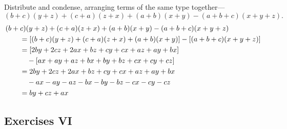 \documentclass[DIN, pagenumber=false, fontsize=11pt, parskip=half]{scrartcl}
\begin{document}
\begin{problems}[from=1,step=1]
    \problem[17] Distribute and condense, arranging terms of the same type together---
    \[
        (b+c)(y+z) + (c+a)(z+x) + (a+b)(x+y) - (a+b+c)(x+y+z).
    \]
    \answer 
    \begin{align*}
        \MoveEqLeft
        (b+c)(y+z) + (c+a)(z+x) + (a+b)(x+y) - (a+b+c)(x+y+z) \\ 
        &=\left[(b+c)(y+z) + (c+a)(z+x) + (a+b)(x+y)\right] - \left[(a+b+c)(x+y+z)\right] \\ 
        &= \left[2by+2cz+2ax+bz+cy+cx+az+ay+bx\right] \\ 
        & \quad - \left[ ax+ay+az+bx+by+bz+cx+cy+cz \right]\\ 
        &= 2by+2cz+2ax+bz+cy+cx+az+ay+bx\\ 
        & \quad -ax-ay-az-bx-by-bz-cx-cy-cz\\ 
        &= by+cz+ax
    \end{align*}
\end{problems}

\subsection{Exercises VI}
\end{document}
